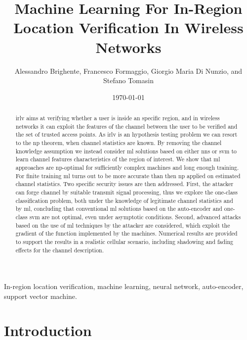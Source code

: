 \documentclass[draftcls,onecolumn,12pt]{IEEEtran}
\title{Machine Learning For In-Region Location Verification In Wireless Networks}
\author{\small Alessandro Brighente, Francesco Formaggio, Giorgio Maria Di Nunzio, and  Stefano Tomasin }
\date{\today}
\begin{document}
\maketitle

\sloppy

\begin{abstract}
\Ac{irlv} aims at verifying whether a user is inside an specific region, and in wireless networks it can exploit the features of the channel between the user to be verified and the set of trusted access points. As \ac{irlv} is an hypothesis testing problem we can resort to the \ac{np} theorem, when channel statistics are known. By removing the channel knowledge assumption we instead consider \ac{ml} solutions based on either \acp{nn} or \ac{svm} to learn channel features characteristics of the region of interest. We show that \ac{ml} approaches are \ac{np}-optimal for sufficiently complex machines and long enough training. For finite training \ac{ml} turns out to be more accurate than then \ac{np} applied on estimated channel statistics. Two specific security issues are then addressed. First, the attacker can forge channel by suitable transmit signal processing, thus we explore the one-class classification problem, both under the knowledge of legitimate channel statistics and by \ac{ml}, concluding that conventional \ac{ml} solutions based on the auto-encoder and one-class \ac{svm} are not optimal, even under asymptotic conditions. Second, advanced attacks based on the use of \ac{ml} techniques by the attacker are considered, which exploit the gradient of the function implemented by the machines. Numerical results are provided to support the results in a realistic cellular scenario, including shadowing and fading effects for the channel description.
\end{abstract}

\begin{IEEEkeywords}
In-region location verification, machine learning, neural network, auto-encoder, support vector machine.
\end{IEEEkeywords}

\glsresetall
\clearpage
\section{Introduction}
\end{document}
